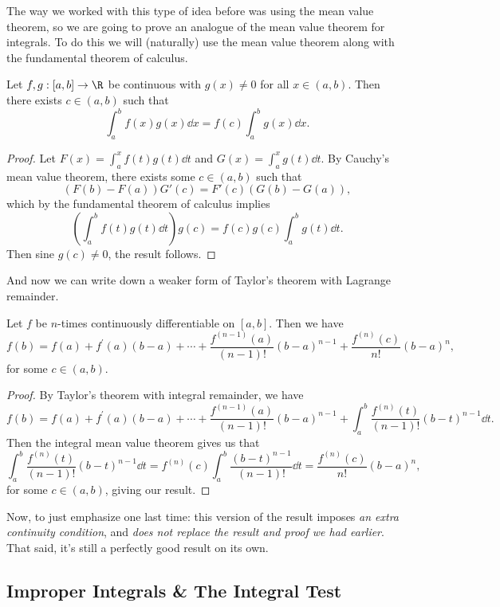 \documentclass[a4paper]{scrartcl}
\begin{document}
The way we worked with this type of idea before was using the mean value theorem, so we are going to prove an analogue of the mean value theorem for integrals. To do this we will (naturally) use the mean value theorem along with the fundamental theorem of calculus.


\begin{lemma}
	Let $f, g : [a, b] \rightarrow \R$ be continuous with $g(x) \neq 0$ for all $x \in (a, b)$. Then there exists $c \in (a, b)$ such that
	$$
	\int_a^b f(x) g(x) \dd x = f(c) \int_a^b g(x) \dd x.
	$$
\end{lemma}
\begin{proof}
	Let $F(x) = \int_a^x f(t) g(t) \dd t$ and $G(x) = \int_a^x g(t) \dd t$.
	By Cauchy's mean value theorem, there exists some $c \in (a, b)$ such that
	$$
	(F(b) - F(a))G'(c) = F'(c)(G(b) - G(a)),
	$$
	which by the fundamental theorem of calculus implies
	$$
	\left(\int_a^b f(t) g(t) \dd t\right)g(c) = f(c) g(c) \int_a^b g(t) \dd t.
	$$
	Then sine $g(c) \neq 0$, the result follows.
\end{proof}


And now we can write down a weaker form of Taylor's theorem with Lagrange remainder.

\begin{theorem}
	Let $f$ be $n$-times continuously differentiable on $[a, b]$. Then we have
	$$
	f(b)=f(a)+f^{\prime}(a)(b-a)+\cdots+\frac{f^{(n-1)}(a)}{(n-1) !}(b-a)^{n-1}+\frac{f^{(n)}(c)}{n !}(b-a)^{n},
	$$
	for some $c \in (a, b)$.
\end{theorem}
\begin{proof}
	By Taylor's theorem with integral remainder, we have
	$$
	f(b)=f(a)+f^{\prime}(a)(b-a)+\cdots+\frac{f^{(n-1)}(a)}{(n-1) !}(b-a)^{n-1}+\int_{a}^{b} \frac{f^{(n)}(t)}{(n-1) !}(b-t)^{n-1} \dd t.
	$$
	Then the integral mean value theorem gives us that
	$$
	\int_{a}^{b} \frac{f^{(n)}(t)}{(n-1) !}(b-t)^{n-1} \dd t = f^{(n)}(c) \int_{a}^{b} \frac{(b-t)^{n-1}}{(n-1) !} \dd t = \frac{f^{(n)}(c)}{n!}(b - a)^n, 
	$$
	for some $c \in (a, b)$, giving our result.
\end{proof}

Now, to just emphasize one last time: this version of the result imposes \emph{an extra continuity condition}, and \emph{does not replace the result and proof we had earlier}. That said, it's still a perfectly good result on its own.

\subsection{Improper Integrals \& The Integral Test}
\end{document}
